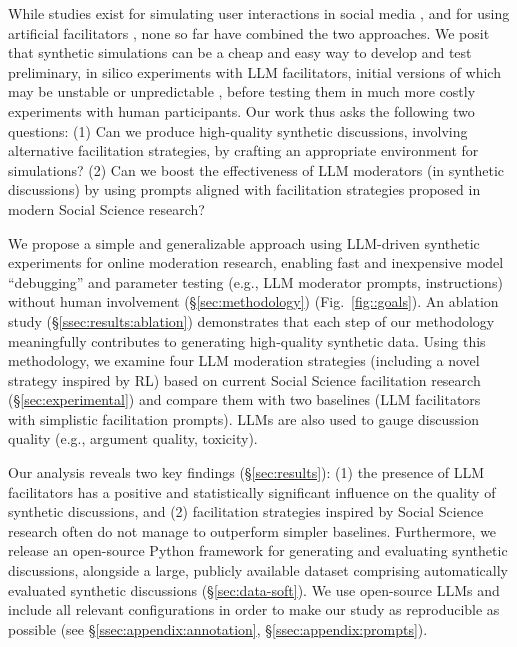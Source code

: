 While studies exist for simulating user interactions in social media \cite{park_simulacra, mou_2024, tornberg_2023, y_social, balog_2024}, and for using artificial facilitators \cite{kim_et_al_chatbot, cho-etal-2024-language}, none so far have combined the two approaches. We posit that synthetic simulations can be a cheap and easy way to develop and test preliminary, in silico experiments with \ac{LLM} facilitators, initial versions of which may be unstable or unpredictable \cite{atil_2025, rossi_2024}, before testing them in much more costly experiments with human participants. Our work thus asks the following two questions: (1) Can we produce high-quality synthetic discussions, involving alternative facilitation strategies, by crafting an appropriate environment for simulations? (2) Can we boost the effectiveness of \ac{LLM} moderators (in synthetic discussions) by using prompts aligned with facilitation strategies proposed in modern Social Science research?

We propose a simple and generalizable approach using \ac{LLM}-driven synthetic experiments for online moderation research, enabling fast and inexpensive model “debugging” and parameter testing (e.g.,  \ac{LLM} moderator prompts, instructions) without human involvement (\S\ref{sec:methodology}) (Fig.~\ref{fig::goals}). An ablation study (\S\ref{ssec:results:ablation}) demonstrates that each step of our methodology meaningfully contributes to generating high-quality synthetic data. Using this methodology, we examine four \ac{LLM} moderation strategies (including a novel strategy inspired by \ac{RL}) based on current Social Science facilitation research (\S\ref{sec:experimental})
and compare them with two baselines (\ac{LLM} facilitators with simplistic facilitation prompts). \acp{LLM} are also used to gauge discussion quality (e.g., argument quality, toxicity).

Our analysis reveals two key findings (\S\ref{sec:results}): (1) the presence of \ac{LLM} facilitators has a positive and statistically significant influence on the quality of synthetic discussions, and (2) facilitation strategies inspired by Social Science research often do not manage to outperform simpler baselines. %
Furthermore, we release \syndisco an open-source Python framework for generating and evaluating synthetic discussions, alongside \vmd\datasetlink a large, publicly available dataset comprising automatically evaluated synthetic discussions (\S\ref{sec:data-soft}). %
We use open-source \acp{LLM} and include all relevant configurations in order to make our study as reproducible as possible (see \S\ref{ssec:appendix:annotation}, \S\ref{ssec:appendix:prompts}).